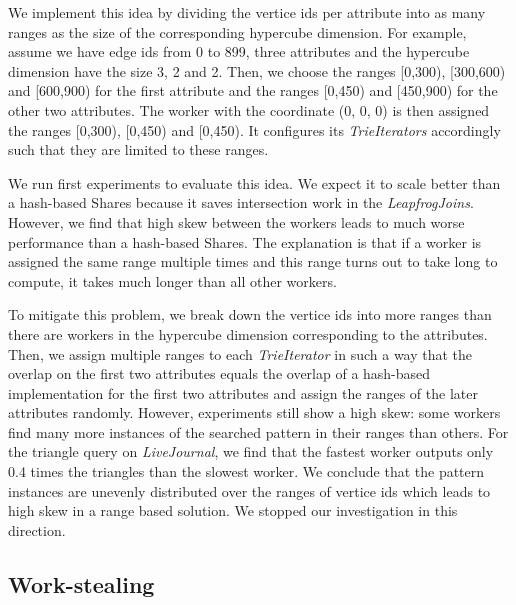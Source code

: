We implement this idea by dividing the vertice ids per attribute into as many ranges as the size of the corresponding hypercube dimension.
For example, assume we have edge ids from 0 to 899, three attributes and the hypercube dimension have the size 3, 2 and 2.
Then, we choose the ranges [0,300), [300,600) and [600,900) for the first attribute and the ranges [0,450) and [450,900) for the other
two attributes.
The worker with the coordinate (0, 0, 0) is then assigned the ranges [0,300), [0,450) and [0,450).
It configures its \textit{TrieIterators} accordingly such that they are limited to these ranges.

We run first experiments to evaluate this idea.
We expect it to scale better than a hash-based Shares because it saves intersection work in the \textit{LeapfrogJoins}.
However, we find that high skew between the workers leads to much worse performance than a hash-based Shares.
The explanation is that if a worker is assigned the same range multiple times and this range turns out to take long to compute, it takes
much longer than all other workers.

To mitigate this problem, we break down the vertice ids into more ranges than there are workers in the hypercube dimension corresponding to
the attributes.
Then, we assign multiple ranges to each \textit{TrieIterator} in such a way that the overlap on the first two attributes equals the overlap
of a hash-based implementation for the first two attributes and assign the ranges of the later attributes randomly.
However, experiments still show a high skew: some workers find many more instances of the searched pattern in their ranges than others.
For the triangle query on \textit{LiveJournal}, we find that the fastest worker outputs only 0.4 times the triangles than the slowest worker.
We conclude that the pattern instances are unevenly distributed over the ranges of vertice ids which leads to high skew in
a range based solution.
We stopped our investigation in this direction.



\subsection{Work-stealing} \label{ssec:work-stealing}
